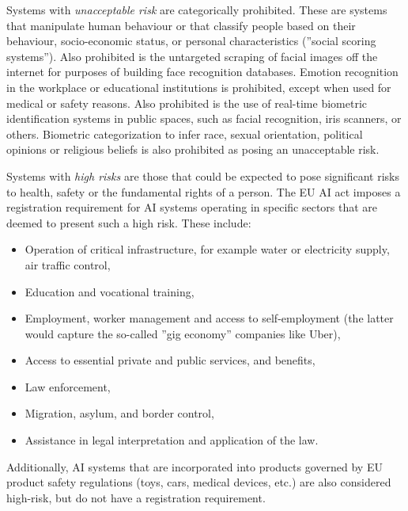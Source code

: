 Systems with \emph{unacceptable risk} are categorically prohibited. These are systems that manipulate human behaviour or that classify people based on their behaviour, socio-economic status, or personal characteristics (''social scoring systems''). Also prohibited is the untargeted scraping of facial images off the internet for purposes of building face recognition databases. Emotion recognition in the workplace or educational institutions is prohibited, except when used for medical or safety reasons. Also prohibited is the use of real-time biometric identification systems in public spaces, such as facial recognition, iris scanners, or others. Biometric categorization to infer race, sexual orientation, political opinions or religious beliefs is also prohibited as posing an unacceptable risk. 

Systems with \emph{high risks} are those that could be expected to pose significant risks to health, safety or the fundamental rights of a person. The EU AI act imposes a registration requirement for AI systems operating in specific sectors that are deemed to present such a high risk. These include: 
\begin{itemize}
  \item Operation of critical infrastructure, for example water or electricity supply, air traffic control,
  \item Education and vocational training,
  \item Employment, worker management and access to self-employment (the latter would capture the so-called ''gig economy'' companies like Uber),
  \item Access to essential private and public services, and benefits,
  \item Law enforcement,
  \item Migration, asylum, and border control,
  \item Assistance in legal interpretation and application of the law.
\end{itemize}

Additionally, AI systems that are incorporated into products governed by EU product safety regulations (toys, cars, medical devices, etc.) are also considered high-risk, but do not have a registration requirement.

